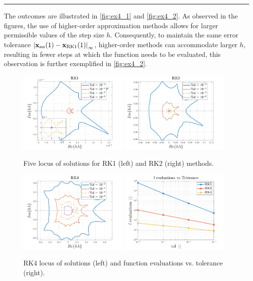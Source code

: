 \documentclass[11pt,a4paper,oneside]{article}
\renewcommand{\vec}[1]{\mathbf{#1}}
\begin{document}
\medskip \hrule \medskip

The outcomes are illustrated in \autoref{fig:ex4_1} and \autoref{fig:ex4_2}. As observed in the figures, 
the use of higher-order approximation methods allows for larger permissible values of the step size $h$. 
Consequently, to maintain the same error tolerance $\left|\vec x_{\rm an}(1)-\vec x_{\rm RK1}(1)\right|_\infty$, 
higher-order methods can accommodate larger $h$, resulting in fewer steps at which the function needs 
to be evaluated, this observation is further exemplified in \autoref{fig:ex4_2}.
\begin{figure}[ht]
\includegraphics[width=0.48\textwidth]{gfx/ex4_1.pdf}
    \includegraphics[width=0.48\textwidth]{gfx/ex4_2.pdf}
    \caption{Five locus of solutions for RK1 (left) and RK2 (right) methods.}
    \label{fig:ex4_1}
\end{figure}
\begin{figure}[ht]
    \centering
    \includegraphics[width=0.48\textwidth]{gfx/ex4_3.pdf}
    \includegraphics[width=0.48\textwidth]{gfx/ex4_4.pdf}
    \caption{RK4 locus of solutions (left) and function evaluations vs. tolerance (right).}
    \label{fig:ex4_2}
\end{figure}
\end{document}
